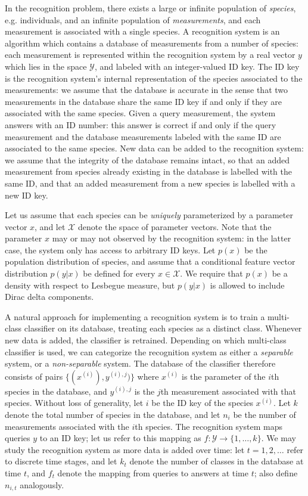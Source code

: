\documentclass{article}
\begin{document}
In the recognition problem, there exists a large or infinite population of \emph{species}, e.g. individuals,
and an infinite population of \emph{measurements}, and each measurement is associated with a single species.
A recognition system is an algorithm which contains a database of measurements from a number of species:
each measurement is represented within the recognition system by a real vector $y$ which lies in the space $\mathcal{Y}$, and labeled with an integer-valued ID key.
The ID key is the recognition system's internal representation of the species associated to the measurements:
we assume that the database is accurate in the sense that two measurements in the database share the same ID key
if and only if they are associated with the same species.
Given a query measurement, the system answers with an ID number: this answer is correct
if and only if the query measurement and the database measurements labeled with the same ID are associated to the same species.
New data can be added to the recognition system: we assume that the integrity of the database remains intact,
so that an added measurement from species already existing in the database is labelled with the same ID,
and that an added measurement from a new species is labelled with a new ID key.

Let us assume that each species can be \emph{uniquely} parameterized by a parameter vector $x$,
and let $\mathcal{X}$ denote the space of parameter vectors.  Note that the parameter $x$ may or may not observed by
the recognition system: in the latter case, the system only has access to arbitrary ID keys.
Let $p(x)$ be the population distribution of species, and assume that a conditional
feature vector distribution $p(y|x)$ be defined for every $x \in
\mathcal{X}$.  We require that $p(x)$ be a density with respect to
Lesbegue measure, but $p(y|x)$ is allowed to include Dirac delta components.

A natural approach for implementing a recognition system is to train a multi-class classifier on its database,
treating each species as a distinct class.  Whenever new data is added, the classifier is retrained.
Depending on which multi-class classifier is used, we can categorize the recognition system as either a
\emph{separable} system, or a \emph{non-separable} system.
The database of the classifier therefore consists of pairs $\{(x^{(i)}), y^{(i), j})\}$
where $x^{(i)}$ is the parameter of the $i$th species in the database, and $y^{(i), j}$ is the $j$th measurement
associated with that species.  Without loss of generality, let $i$ be the ID key of the species $x^{(i)}$.
Let $k$ denote the total number of species in the database, and let $n_i$ be the number of measurements
associated with the $i$th species.
The recognition system maps queries $y$ to an ID key; let us refer to this mapping as $f:\mathcal{Y} \to \{1,\hdots, k\}$.
We may study the recognition system as more data is added over time: let $t = 1, 2 ,\hdots$ refer to discrete time stages,
and let $k_t$ denote the number of classes in the database at time $t$, and $f_t$ denote the mapping from queries to answers
at time $t$; also define $n_{i, t}$ analogously.
\end{document}
